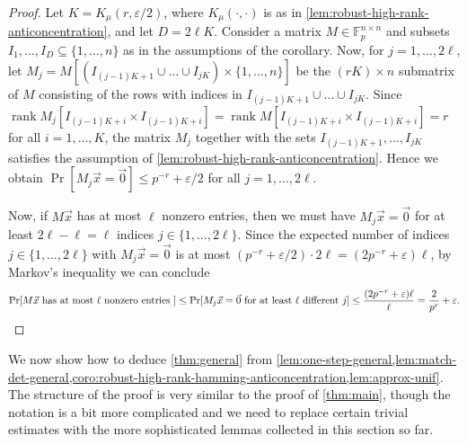 \documentclass[10pt,reqno]{amsart}
\numberwithin{equation}{section}
\theoremstyle{remark}
\newcommand{\mb}{\mathbb}
\newcommand{\on}{\operatorname}
\begin{document}
\begin{proof}
    Let $K=K_\mu(r,\varepsilon/2)$, where $K_\mu(\cdot,\cdot)$ is as in \cref{lem:robust-high-rank-anticoncentration}, and let $D=2\ell K$. Consider a matrix $M\in \mb F_p^{n\times n}$ and subsets $I_1,\dots,I_{D}\subseteq\{1,\dots,n\}$ as in the assumptions of the corollary. Now, for $j=1,\dots,2\ell$, let $M_j=M[(I_{(j-1)K+1}\cup \dots\cup I_{jK})\times \{1,\dots,n\}]$ be the $(rK)\times n$ submatrix of $M$ consisting of the rows with indices in $I_{(j-1)K+1}\cup \dots\cup I_{jK}$. Since $\on{rank} M_j[I_{(j-1)K+i}\times I_{(j-1)K+i}]=\on{rank} M[I_{(j-1)K+i}\times I_{(j-1)K+i}]=r$ for all $i=1,\dots,K$, the matrix $M_j$ together with the sets $I_{(j-1)K+1},\dots,I_{jK}$ satisfies the assumption of \cref{lem:robust-high-rank-anticoncentration}. Hence we obtain $\Pr[ M_j\vec{x}=\vec{0}]\le p^{-r}+\varepsilon/2$ for all $j=1,\dots,2\ell$.

    Now, if $M\vec{x}$ has at most $\ell$ nonzero entries, then we must have  $M_j\vec{x}=\vec{0}$ for at least $2\ell-\ell=\ell$ indices $j\in \{1,\dots,2\ell\}$. Since the expected number of indices $j\in \{1,\dots,2\ell\}$ with $M_j\vec{x}=\vec{0}$ is at most $(p^{-r}+\varepsilon/2)\cdot 2\ell=(2p^{-r}+\varepsilon)\ell$, by Markov's inequality we can conclude
    \[\Pr[ M\vec{x} \text{ has at most }\ell\text{ nonzero entries }]\le \Pr[ M_j\vec{x}=\vec{0} \text{ for at least }\ell\text{ different } j]\le \frac{(2p^{-r}+\varepsilon)\ell}{\ell}=\frac 2{p^r}+\varepsilon.\qedhere\]
\end{proof}

We now show how to deduce \cref{thm:general} from \cref{lem:one-step-general,lem:match-det-general,coro:robust-high-rank-hamming-anticoncentration,lem:approx-unif}. The structure of the proof is very similar to the proof of \cref{thm:main}, though the notation is a bit more complicated and we need to replace certain trivial estimates with the more sophisticated lemmas collected in this section so far.
\end{document}

